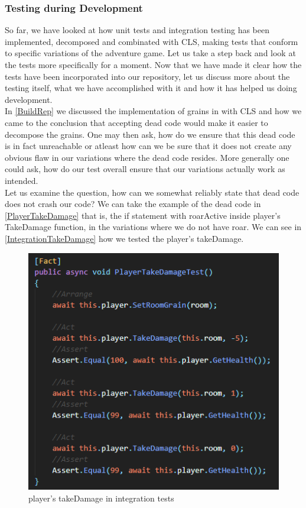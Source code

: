 \subsubsection{Testing during Development}
So far, we have looked at how unit tests and integration testing has been implemented, decomposed and combinated with CLS, making tests that conform to specific variations of the adventure game. Let us take a step back and look at the tests more specifically for a moment. Now that we have made it clear how the tests have been incorporated into our repository, let us discuss more about the testing itself, what we have accomplished with it and how it has helped us doing development. \\
In \autoref{BuildRep} we discussed the implementation of grains in with CLS and how we came to the conclusion that accepting dead code would make it easier to decompose the grains. One may then ask, how do we ensure that this dead code is in fact unreachable or atleast how can we be sure that it does not create any obvious flaw in our variations where the dead code resides. More generally one could ask, how do our test overall ensure that our variations actually work as intended. \\ 
Let us examine the question, how can we somewhat reliably state that dead code does not crash our code? We can take the example of the dead code in \autoref{PlayerTakeDamage} that is, the if statement with roarActive inside player's TakeDamage function, in the variations where we do not have roar. We can see in \autoref{IntegrationTakeDamage} how we tested the player's takeDamage.
\begin{figure}[]
    \centering
    \includegraphics[width=0.6\linewidth]{Materials/TestingDiscussion/IntegrationTakeDamage}
    \caption{player's takeDamage in integration tests}
    \label{IntegrationTakeDamage}
\end{figure} 
